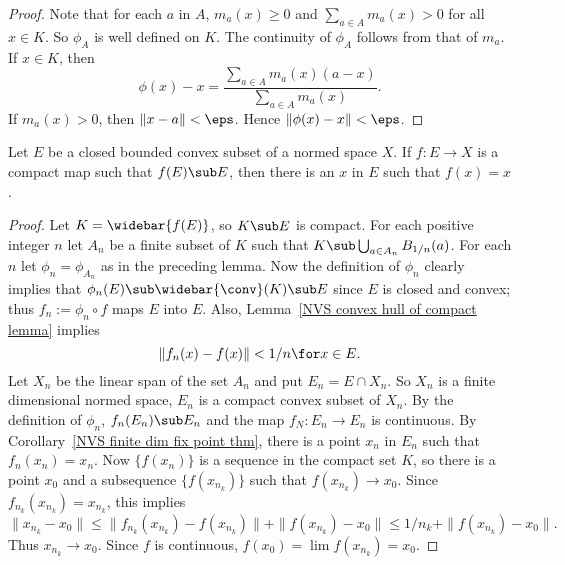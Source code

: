 \begin{proof}
Note that for each $a$ in $A$, $m_a(x)\geq 0$ and $\sum_{a\in A}m_a(x)>0$ for all $x\in K$. So $\phi_A$ is well defined on $K$. The continuity of $\phi_A$ follows from that of $m_a$. If $x\in K$, then
\[\phi(x)-x=\frac{\sum_{a\in A}m_a(x)(a-x)}{\sum_{a\in A}m_a(x)}.\]
If $m_a(x)>0$, then $\|x-a\|<\eps$. Hence $\|\phi(x)-x\|<\eps$.
\end{proof}
\begin{theorem}\label{Schauder fixed point theorem}
Let $E$ be a closed bounded convex subset of a normed space $X$. If $f:E\to X$ is a compact map such that $f(E)\sub E$, then there is an $x$ in $E$ such that $f(x)=x$.
\end{theorem}
\begin{proof}
Let $K=\widebar{f(E)}$, so $K\sub E$ is compact. For each positive integer $n$ let $A_n$ be a finite subset of $K$ such that $K\sub\bigcup_{a\in A_n}B_{1/n}(a)$. For each $n$ let $\phi_n=\phi_{A_n}$ as in the preceding lemma. Now the definition of $\phi_n$ clearly implies that $\phi_n(E)\sub\widebar{\conv}(K)\sub E$ since $E$ is closed and convex; thus $f_n:=\phi_n\circ f$ maps $E$ into $E$. Also, Lemma~\ref{NVS convex hull of compact lemma} implies
\[\|f_n(x)-f(x)\|<1/n\for x\in E.\]
Let $X_n$ be the linear span of the set $A_n$ and put $E_n=E\cap X_n$. So $X_n$ is a finite dimensional normed space, $E_n$ is a compact convex subset of $X_n$. By the definition of $\phi_n$, $f_n(E_n)\sub E_n$ and the map $f_N:E_n\to E_n$ is continuous. By Corollary~\ref{NVS finite dim fix point thm}, there is a point $x_n$ in $E_n$ such that $f_n(x_n)=x_n$. Now $\{f(x_n)\}$ is a sequence in the compact set $K$, so there is a point $x_0$ and a subsequence $\{f(x_{n_k})\}$ such that $f(x_{n_k})\to x_0$. Since $f_{n_k}(x_{n_k})=x_{n_k}$, this implies
\[\|x_{n_k}-x_0\|\leq\|f_{n_k}(x_{n_k})-f(x_{n_k})\|+\|f(x_{n_k})-x_0\|\leq 1/n_{k}+\|f(x_{n_k})-x_0\|.\]
Thus $x_{n_k}\to x_0$. Since $f$ is continuous, $f(x_0)=\lim f(x_{n_k})=x_0$.
\end{proof}
